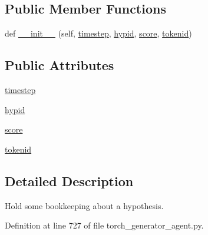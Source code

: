 \subsection*{Public Member Functions}
\begin{DoxyCompactItemize}
\item 
def \hyperlink{classparlai_1_1core_1_1torch__generator__agent_1_1__HypothesisTail_a126c399a12a4e57d6dffaf78a27f129c}{\+\_\+\+\_\+init\+\_\+\+\_\+} (self, \hyperlink{classparlai_1_1core_1_1torch__generator__agent_1_1__HypothesisTail_a93efff1b214a2d98848f8b3d4bf59367}{timestep}, \hyperlink{classparlai_1_1core_1_1torch__generator__agent_1_1__HypothesisTail_a4957647a4492d6cdca0c2f61cce123d5}{hypid}, \hyperlink{classparlai_1_1core_1_1torch__generator__agent_1_1__HypothesisTail_a40f7d1630bf982c5206d8f3a86fd1d3c}{score}, \hyperlink{classparlai_1_1core_1_1torch__generator__agent_1_1__HypothesisTail_a354a80abd13b7da3fd1d116c639a4f1a}{tokenid})
\end{DoxyCompactItemize}
\subsection*{Public Attributes}
\begin{DoxyCompactItemize}
\item 
\hyperlink{classparlai_1_1core_1_1torch__generator__agent_1_1__HypothesisTail_a93efff1b214a2d98848f8b3d4bf59367}{timestep}
\item 
\hyperlink{classparlai_1_1core_1_1torch__generator__agent_1_1__HypothesisTail_a4957647a4492d6cdca0c2f61cce123d5}{hypid}
\item 
\hyperlink{classparlai_1_1core_1_1torch__generator__agent_1_1__HypothesisTail_a40f7d1630bf982c5206d8f3a86fd1d3c}{score}
\item 
\hyperlink{classparlai_1_1core_1_1torch__generator__agent_1_1__HypothesisTail_a354a80abd13b7da3fd1d116c639a4f1a}{tokenid}
\end{DoxyCompactItemize}


\subsection{Detailed Description}
\begin{DoxyVerb}Hold some bookkeeping about a hypothesis.\end{DoxyVerb}
 

Definition at line 727 of file torch\+\_\+generator\+\_\+agent.\+py.




